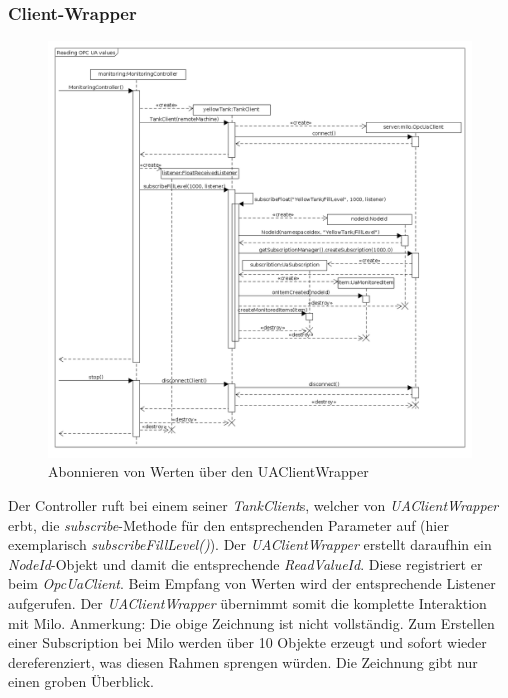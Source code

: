 \documentclass[parskip=full]{scrartcl}
\begin{document}
\subsubsection{Client-Wrapper}
\label{milo-wrapper-diagram}
\begin{figure}[H]
  \centering
  \includegraphics[scale=0.4]{design/sequence-diagrams/sequence-subscribe-client-value.png}
  \caption{Abonnieren von Werten über den UAClientWrapper}
\end{figure}
Der Controller ruft bei einem seiner \emph{TankClient}s, welcher von \emph{UAClientWrapper} erbt, die \emph{subscribe}-Methode für den entsprechenden Parameter auf
(hier exemplarisch \emph{subscribeFillLevel()}). Der \emph{UAClientWrapper} erstellt daraufhin ein \emph{NodeId}-Objekt und damit die
entsprechende \emph{ReadValueId}. Diese registriert er beim \emph{OpcUaClient}.
Beim Empfang von Werten wird der entsprechende Listener aufgerufen. Der \emph{UAClientWrapper} übernimmt somit die
komplette Interaktion mit Milo. Anmerkung: Die obige Zeichnung ist nicht vollständig. Zum Erstellen einer Subscription bei Milo werden über 10
Objekte erzeugt und sofort wieder dereferenziert, was diesen Rahmen sprengen würden. Die Zeichnung gibt nur einen groben Überblick.
\end{document}
